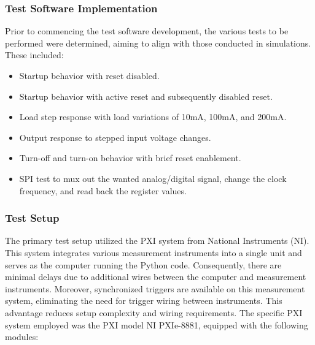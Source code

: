 \subsubsection{Test Software Implementation}
Prior to commencing the test software development, the various tests to be performed were determined, aiming to align with those conducted in simulations. These included:
\begin{itemize}
    \item Startup behavior with reset disabled.
    \item Startup behavior with active reset and subsequently disabled reset.
    \item Load step response with load variations of 10mA, 100mA, and 200mA.
    \item Output response to stepped input voltage changes.
    \item Turn-off and turn-on behavior with brief reset enablement.
    \item SPI test to mux out the wanted analog/digital signal, change the clock frequency, and read back the register values.
\end{itemize}

\subsubsection{Test Setup}
The primary test setup utilized the PXI system from National Instruments (NI). This system integrates various measurement instruments into a single unit and serves as the computer running the Python code. Consequently, there are minimal delays due to additional wires between the computer and measurement instruments. Moreover, synchronized triggers are available on this measurement system, eliminating the need for trigger wiring between instruments. This advantage reduces setup complexity and wiring requirements. The specific PXI system employed was the PXI model \glqq{}NI PXIe-8881\grqq{}, equipped with the following modules:

